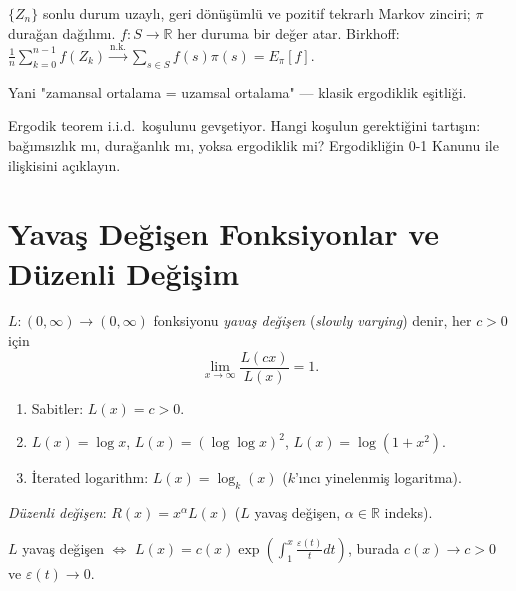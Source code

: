 \begin{ornek}
$\{Z_n\}$ sonlu durum uzaylı, geri dönüşümlü ve pozitif tekrarlı Markov zinciri;
$\pi$ durağan dağılımı. $f: S \to \mathbb{R}$ her duruma bir değer atar.
Birkhoff: $\frac{1}{n}\sum_{k=0}^{n-1} f(Z_k) \xrightarrow{\text{n.k.}} \sum_{s\in S} f(s)\pi(s) = E_\pi[f]$.

Yani "zamansal ortalama = uzamsal ortalama" --- klasik ergodiklik eşitliği.
\end{ornek}

\begin{kritiksorgu}
Ergodik teorem i.i.d.\ koşulunu gevşetiyor. Hangi koşulun gerektiğini tartışın:
bağımsızlık mı, durağanlık mı, yoksa ergodiklik mi? Ergodikliğin 0-1 Kanunu
ile ilişkisini açıklayın.
\end{kritiksorgu}

\section{Yavaş Değişen Fonksiyonlar ve Düzenli Değişim}
\label{sec:duzenli_degisim}

\begin{tanim}\label{def:yavas_degisen}
$L:(0,\infty)\to(0,\infty)$ fonksiyonu \emph{yavaş değişen} (\emph{slowly varying}) denir, her $c>0$ için
\[
  \lim_{x\to\infty}\frac{L(cx)}{L(x)}=1.
\]
\end{tanim}

\begin{ornek}\label{ex:yavas_ornekler}
\begin{enumerate}
  \item Sabitler: $L(x)=c>0$.
  \item $L(x)=\log x$, $L(x)=(\log\log x)^2$, $L(x)=\log(1+x^2)$.
  \item İterated logarithm: $L(x)=\log_k(x)$ ($k$'ıncı yinelenmiş logaritma).
\end{enumerate}
\emph{Düzenli değişen}: $R(x)=x^\alpha L(x)$ ($L$ yavaş değişen, $\alpha\in\mathbb{R}$ indeks).
\end{ornek}

\begin{teorem}\label{thm:karamata}
$L$ yavaş değişen $\iff$ $L(x)=c(x)\exp\!\left(\int_1^x \frac{\varepsilon(t)}{t}dt\right)$,
burada $c(x)\to c>0$ ve $\varepsilon(t)\to0$.
\end{teorem}

